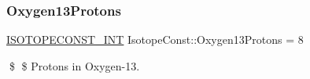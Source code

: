 \subsubsection{\texorpdfstring{Oxygen13\+Protons}{Oxygen13Protons}}
{\footnotesize\ttfamily \mbox{\hyperlink{group___isotope_const-_macros_ga5f18360b3e99483a35c32d789e62621c}{I\+S\+O\+T\+O\+P\+E\+C\+O\+N\+S\+T\+\_\+\+I\+NT}} Isotope\+Const\+::\+Oxygen13\+Protons = 8}

\$ \$ Protons in Oxygen-\/13. 